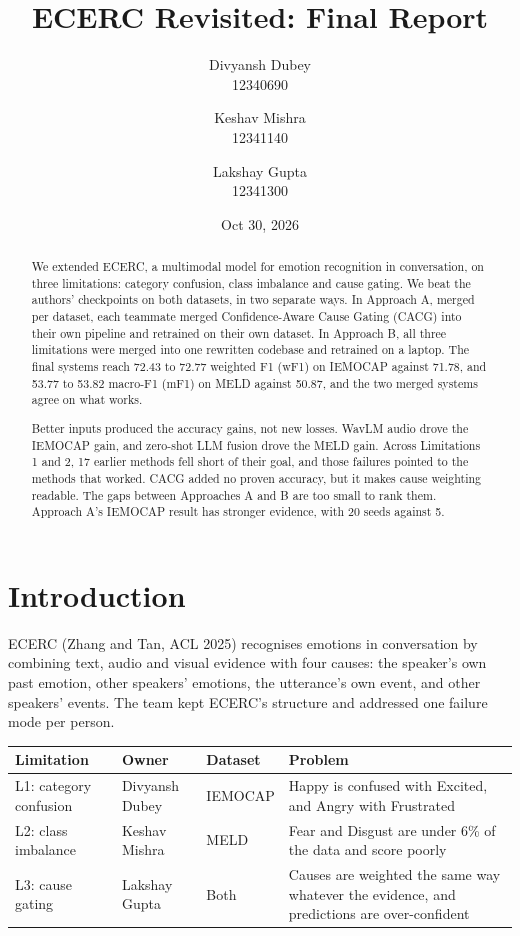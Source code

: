 \documentclass[11pt,a4paper]{article}
\title{ECERC Revisited: Final Report}
\author{Divyansh Dubey\\12340690 \and Keshav Mishra\\12341140 \and Lakshay Gupta\\12341300}
\date{Oct 30, 2026}
\begin{document}
\maketitle

\begin{abstract}
We extended ECERC, a multimodal model for emotion recognition in conversation, on three limitations: category confusion, class imbalance and cause gating. We beat the authors' checkpoints on both datasets, in two separate ways. In Approach A, merged per dataset, each teammate merged Confidence-Aware Cause Gating (CACG) into their own pipeline and retrained on their own dataset. In Approach B, all three limitations were merged into one rewritten codebase and retrained on a laptop. The final systems reach 72.43 to 72.77 weighted F1 (wF1) on IEMOCAP against 71.78, and 53.77 to 53.82 macro-F1 (mF1) on MELD against 50.87, and the two merged systems agree on what works.

Better inputs produced the accuracy gains, not new losses. WavLM audio drove the IEMOCAP gain, and zero-shot LLM fusion drove the MELD gain. Across Limitations 1 and 2, 17 earlier methods fell short of their goal, and those failures pointed to the methods that worked. CACG added no proven accuracy, but it makes cause weighting readable. The gaps between Approaches A and B are too small to rank them. Approach A's IEMOCAP result has stronger evidence, with 20 seeds against 5.
\end{abstract}

\section{Introduction}
\label{sec:intro}

ECERC (Zhang and Tan, ACL 2025) \cite{ecerc} recognises emotions in conversation by combining text, audio and visual evidence with four causes: the speaker's own past emotion, other speakers' emotions, the utterance's own event, and other speakers' events. The team kept ECERC's structure and addressed one failure mode per person.

\begin{center}
\begin{tabular}{L{3.6cm}L{2.7cm}L{1.6cm}L{7.8cm}}
\toprule
Limitation & Owner & Dataset & Problem \\
\midrule
L1: category confusion & Divyansh Dubey & IEMOCAP & Happy is confused with Excited, and Angry with Frustrated \\
L2: class imbalance & Keshav Mishra & MELD & Fear and Disgust are under 6\% of the data and score poorly \\
L3: cause gating & Lakshay Gupta & Both & Causes are weighted the same way whatever the evidence, and predictions are over-confident \\
\bottomrule
\end{tabular}
\end{center}
\end{document}
